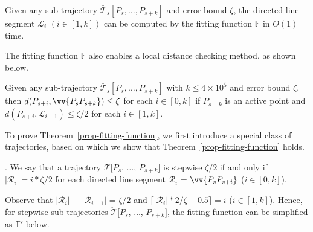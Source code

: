\begin{pprop}
\label{prop-fitting-func-time}
Given any sub-trajectory $\dddot{\mathcal{T}_s}[P_s, \ldots, P_{s+k}]$ and error bound $\zeta$, the directed line segment $\mathcal{L}_{i}$ $(i\in[1,k])$ can be computed by the fitting function $\mathbb{F}$  in $O(1)$ time.
\end{pprop}

The fitting function $\mathbb{F}$ also enables a local distance checking method, as shown below.

\begin{ttheorem}
\label{prop-fitting-function}
Given any sub-trajectory $\dddot{\mathcal{T}_s}[P_s, \ldots, P_{s+k}]$ with $k\le 4\times 10^5$ and error bound $\zeta$,
then $d(P_{s+i}, {\vv{P_{s}P_{s+k}})}\le \zeta$ for each $i\in[0, k]$ if $P_{s+k}$ is an active point and $d(P_{s+i}, \mathcal{L}_{i-1})\le \zeta/2$ for each $i\in[1, k]$.
\end{ttheorem}


To prove Theorem~\ref{prop-fitting-function}, we first introduce a special class of trajectories, based on which we show that Theorem~\ref{prop-fitting-function} holds.

. We say that a trajectory $\dddot{\mathcal{T}}[P_s$, $\ldots$, $P_{s+k}]$ is stepwise \wrt $\zeta/2$ if and only if $|\mathcal{R}_{i}| = i*\zeta/2$ for each directed line segment $\mathcal{R}_{i}$ = $\vv{P_sP_{s+i}}$ ($i\in[0,k]$).

Observe that $|\mathcal{R}_{i}|$  $-$ $|\mathcal{R}_{i-1}|$ = $\zeta/2$  and $\lceil|\mathcal{R}_{i}|*2/\zeta - 0.5\rceil = i$ ($i\in[1, k]$).
Hence, for stepwise sub-trajectories  $\dddot{\mathcal{T}}[P_s$, $\ldots$, $P_{s+k}]$, the  fitting function can be simplified as  $\mathbb{F}'$ below.

